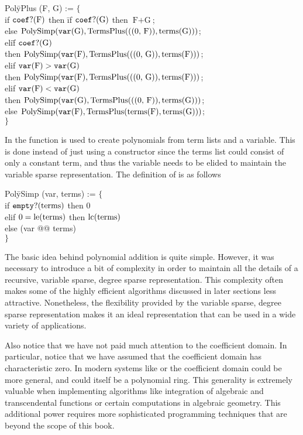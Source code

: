 \begindsacode
Pol\=yPlus (F, G) := $\{$ \\
\>if $\mathop{\tt coef?}\nolimits(\mbox{F})$ then \=if $\mathop{\tt coef?}\nolimits(\mbox{G})$ then $\mbox{F}+\mbox{G}$; \\
\>\>else $\mbox{PolySimp}(\mathop{\tt var}\nolimits(\mbox{G}), \mbox{TermsPlus}(\mbox{((0, F))}, \operatorname{terms}(\mbox{G})))$; \\
\>eli\=f $\mathop{\tt coef?}\nolimits(\mbox{G})$\\
\>\> then $\mbox{PolySimp}(\mathop{\tt var}\nolimits(\mbox{F}), \mbox{TermsPlus}(\mbox{((0, G))}, \operatorname{terms}(\mbox{F})))$; \\
\>elif $\mathop{\tt var}\nolimits(\mbox{F}) > \mathop{\tt var}\nolimits(\mbox{G})$ \\
\>\>then $\mbox{PolySimp}(\mathop{\tt var}\nolimits(\mbox{F}), \mbox{TermsPlus}(\mbox{((0, G))}, \operatorname{terms}(\mbox{F})))$; \\
\>elif $\mathop{\tt var}\nolimits(\mbox{F}) < \mathop{\tt var}\nolimits(\mbox{G})$ \\
\>\>then $\mbox{PolySimp}(\mathop{\tt var}\nolimits(\mbox{G}), \mbox{TermsPlus}(\mbox{((0, \mbox{F}))}, \operatorname{terms}(\mbox{G})))$; \\
\>else $\mbox{PolySimp}(\mathop{\tt var}\nolimits(\mbox{F}), \mbox{TermsPlus}(\operatorname{terms}(\mbox{F}), \operatorname{terms}(\mbox{G})))$;\\
\>$\}$
\enddsacode

In  the function  is used to create
polynomials from term lists and a variable.  This is done instead of
just using a constructor since the terms list could consist of only a
constant term, and thus the variable needs to be elided to maintain
the variable sparse representation.  The definition of 
is as follows

\begindsacode
Pol\=ySimp (var, terms) := $\{$\\
\>if $\mathop{\tt empty?}\nolimits(\mbox{terms})$ then $0$ \\
\>elif $0 = \operatorname{le}(\mbox{terms})$ then $\operatorname{lc}(\mbox{terms})$\\
\>else (var @@ terms)\\
\> $\}$
\enddsacode

The basic idea behind polynomial addition is quite simple.  However,
it was necessary to introduce a bit of complexity in order to maintain
all the details of a recursive, variable sparse, degree sparse
representation.  This complexity often makes some of the highly
efficient algorithms discussed in later sections less attractive.
Nonetheless, the flexibility provided by the variable sparse, degree
sparse representation makes it an ideal representation that can be
used in a wide variety of applications.

Also notice that we have not paid much attention to the coefficient
domain.  In particular, notice that we have assumed that the
coefficient domain has characteristic zero.  In modern systems like
{\Axiom} \cite{Jenks92} or {\Weyl} \cite{Weyl:Ref} the coefficient
domain could be more general, and could itself be a polynomial ring.
This generality is extremely valuable when implementing algorithms
like integration of algebraic and transcendental functions or certain
computations in algebraic geometry.  This additional power requires
more sophisticated programming techniques that are beyond the scope of
this book.

